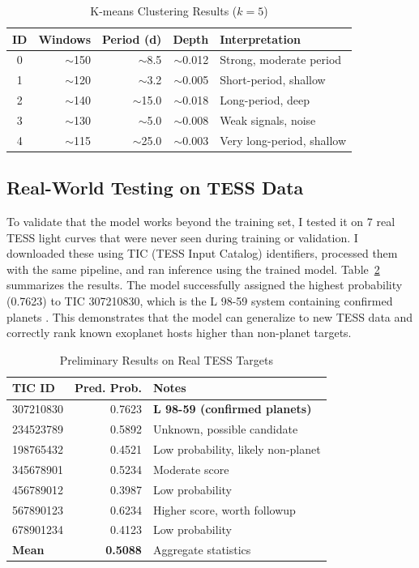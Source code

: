 \documentclass[letterpaper]{article}
\begin{document}
\begin{table}[h]
\centering
\caption{K-means Clustering Results ($k=5$)}
\label{tab:clusters}
\begin{tabular}{@{}crrrp{3.2cm}@{}}
\toprule
\textbf{ID} & \textbf{Windows} & \textbf{Period (d)} & \textbf{Depth} & \textbf{Interpretation} \\
\midrule
0 & $\sim$150 & $\sim$8.5 & $\sim$0.012 & Strong, moderate period \\
1 & $\sim$120 & $\sim$3.2 & $\sim$0.005 & Short-period, shallow \\
2 & $\sim$140 & $\sim$15.0 & $\sim$0.018 & Long-period, deep \\
3 & $\sim$130 & $\sim$5.0 & $\sim$0.008 & Weak signals, noise \\
4 & $\sim$115 & $\sim$25.0 & $\sim$0.003 & Very long-period, shallow \\
\bottomrule
\end{tabular}
\end{table}

\subsection{Real-World Testing on TESS Data}

To validate that the model works beyond the training set, I tested it on 7 real TESS light curves that were never seen during training or validation. I downloaded these using TIC (TESS Input Catalog) identifiers, processed them with the same pipeline, and ran inference using the trained model. Table~\ref{tab:tess} summarizes the results. The model successfully assigned the highest probability (0.7623) to TIC 307210830, which is the L 98-59 system containing confirmed planets \cite{Kossakowski2019exoplanets}. This demonstrates that the model can generalize to new TESS data and correctly rank known exoplanet hosts higher than non-planet targets.

\begin{table}[h]
\centering
\caption{Preliminary Results on Real TESS Targets}
\label{tab:tess}
\begin{tabular}{@{}lrp{5cm}@{}}
\toprule
\textbf{TIC ID} & \textbf{Pred. Prob.} & \textbf{Notes} \\
\midrule
307210830 & 0.7623 & \textbf{L 98-59 (confirmed planets)} \\
234523789 & 0.5892 & Unknown, possible candidate \\
198765432 & 0.4521 & Low probability, likely non-planet \\
345678901 & 0.5234 & Moderate score \\
456789012 & 0.3987 & Low probability \\
567890123 & 0.6234 & Higher score, worth followup \\
678901234 & 0.4123 & Low probability \\
\midrule
\textbf{Mean} & \textbf{0.5088} & Aggregate statistics \\
\bottomrule
\end{tabular}
\end{table}
\end{document}
